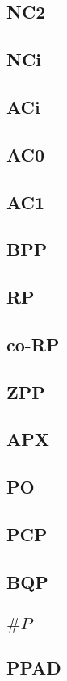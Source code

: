 \documentclass[]{article}
\begin{document}
\subsection{NC2}

\subsection{NCi}

\subsection{ACi}

\subsection{AC0}

\subsection{AC1}

\subsection{BPP}

\subsection{RP}

\subsection{co-RP}

\subsection{ZPP}

\subsection{APX}

\subsection{PO}

\subsection{PCP}

\subsection{BQP}

\subsection{$\# P$}

\subsection{PPAD}
\end{document}
